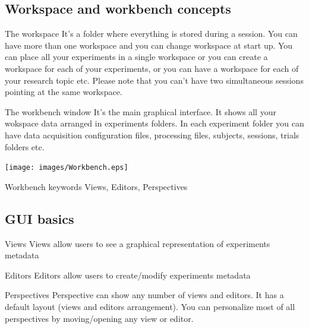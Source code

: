 \documentclass[a4paper,11pt]{beamer}
\begin{document}
\subsection{Workspace and workbench concepts}
\begin{frame}
\begin{block}{The workspace}
\justifying
It's a folder where everything is stored during a session.
You can have more than one workspace and you can change workspace at start up.
You can place all your experiments in a single workspace or you can create a workspace
for each of your experiments, or you can have a workspace for each of your research topic etc. Please note that you can't have two simultaneous sessions pointing at the same workspace.
\end{block}

\begin{block}{The workbench window}
\justifying
It's the main graphical interface. It shows all your wokspace data arranged in experiments folders. In each experiment folder you can have data acquisition configuration files, processing files, subjects, sessions, trials folders etc.
\end{block}
\end{frame}

\begin{frame}
\centering
\texttt{[image: images/Workbench.eps]}

\begin{alertblock}{Workbench keywords}
\centering
Views, Editors, Perspectives
\end{alertblock}
\end{frame}

\subsection{GUI basics}
\begin{frame}
\begin{alertblock}{Views}
\centering
Views allow users to see a graphical representation of experiments metadata
\end{alertblock}
\begin{alertblock}{Editors}
\centering
Editors allow users to create/modify experiments metadata
\end{alertblock}
\begin{alertblock}{Perspectives}
\justifying
Perspective can show any number of views and editors. It has a default
layout (views and editors arrangement). You can personalize most of all perspectives
by moving/opening any view or editor.
\end{alertblock}
\end{frame}
\end{document}
